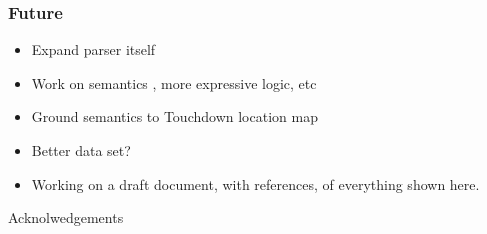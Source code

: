 \documentclass{beamer}
\begin{document}
\begin{frame}
\frametitle{Future}
\begin{itemize} 
\item Expand parser itself
\item Work on semantics , more expressive logic, etc
\item Ground semantics to Touchdown location map
\item Better data set?
\item Working on a draft document, with references, of everything shown here.
\end{itemize} 
\end{frame}

\begin{frame}
Acknolwedgements
\end{frame}
\end{document}
